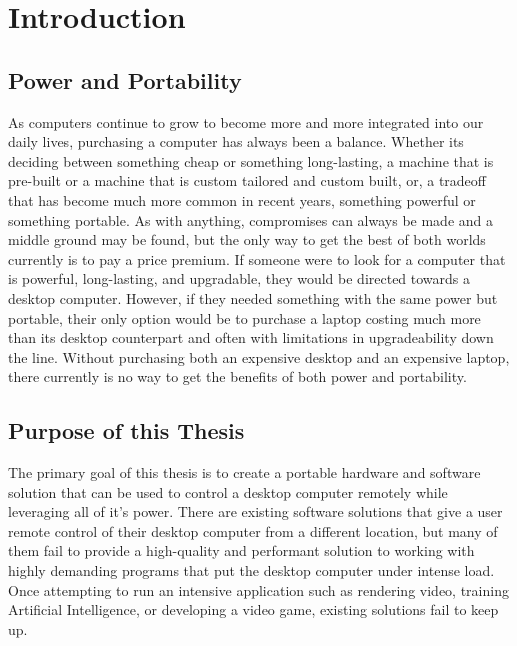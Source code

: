 \chapter{Introduction} %

\label{Chapter1} %

\section{Power and Portability}

As computers continue to grow to become more and more integrated into our daily lives, purchasing a computer has always been a balance.
Whether its deciding between something cheap or something long-lasting, a machine that is pre-built or a machine that is custom tailored and custom built, or, a tradeoff that has become much more common in recent years, something powerful or something portable.
As with anything, compromises can always be made and a middle ground may be found, but the only way to get the best of both worlds currently is to pay a price premium.
If someone were to look for a computer that is powerful, long-lasting, and upgradable, they would be directed towards a desktop computer.
However, if they needed something with the same power but portable, their only option would be to purchase a laptop costing much more than its desktop counterpart and often with limitations in upgradeability down the line.
Without purchasing both an expensive desktop and an expensive laptop, there currently is no way to get the benefits of both power and portability.


\section{Purpose of this Thesis}

The primary goal of this thesis is to create a portable hardware and software solution that can be used to control a desktop computer remotely while leveraging all of it's power.
There are existing software solutions that give a user remote control of their desktop computer from a different location, but many of them fail to provide a high-quality and performant solution to working with highly demanding programs that put the desktop computer under intense load.
Once attempting to run an intensive application such as rendering video, training Artificial Intelligence, or developing a video game, existing solutions fail to keep up.

